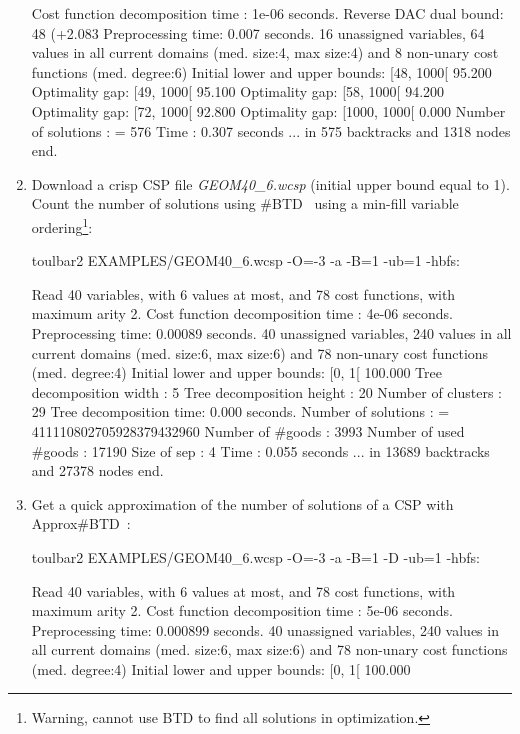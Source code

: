 \begin{enumerate}
{\begin{DoxyCode}
Cost function decomposition time : 1e-06 seconds.
Reverse DAC dual bound: 48 (+2.083%
Preprocessing time: 0.007 seconds.
16 unassigned variables, 64 values in all current domains (med. size:4, max size:4) and 8 non-unary cost functions (med. degree:6)
Initial lower and upper bounds: [48, 1000[ 95.200%
Optimality gap: [49, 1000[ 95.100 %
Optimality gap: [58, 1000[ 94.200 %
Optimality gap: [72, 1000[ 92.800 %
Optimality gap: [1000, 1000[ 0.000 %
Number of solutions    : =  576
Time                   :    0.307 seconds
... in 575 backtracks and 1318 nodes
end.
\end{DoxyCode}}
\item Download a crisp CSP file {\em GEOM40\_6.wcsp} (initial upper bound equal to 1). Count the number of solutions using \#BTD~\cite{Favier09a} using a min-fill variable ordering\footnote{Warning, cannot use BTD to find all solutions in optimization.}:
\begin{DoxyCode}
	toulbar2 EXAMPLES/GEOM40_6.wcsp -O=-3 -a -B=1 -ub=1 -hbfs:
\end{DoxyCode}
{\scriptsize
\begin{DoxyCode}
Read 40 variables, with 6 values at most, and 78 cost functions, with maximum arity 2.
Cost function decomposition time : 4e-06 seconds.
Preprocessing time: 0.00089 seconds.
40 unassigned variables, 240 values in all current domains (med. size:6, max size:6) and 78 non-unary cost functions (med. degree:4)
Initial lower and upper bounds: [0, 1[ 100.000%
Tree decomposition width  : 5
Tree decomposition height : 20
Number of clusters        : 29
Tree decomposition time: 0.000 seconds.
Number of solutions    : =  411110802705928379432960
Number of #goods       :    3993
Number of used #goods  :    17190
Size of sep            :    4
Time                   :    0.055 seconds
... in 13689 backtracks and 27378 nodes
end.
\end{DoxyCode}}
\item Get a quick approximation of the number of solutions of a CSP with Approx\#BTD~\cite{Favier09a}:
\begin{DoxyCode}
	toulbar2 EXAMPLES/GEOM40_6.wcsp -O=-3 -a -B=1 -D -ub=1 -hbfs:
\end{DoxyCode}
{\scriptsize
\begin{DoxyCode}
Read 40 variables, with 6 values at most, and 78 cost functions, with maximum arity 2.
Cost function decomposition time : 5e-06 seconds.
Preprocessing time: 0.000899 seconds.
40 unassigned variables, 240 values in all current domains (med. size:6, max size:6) and 78 non-unary cost functions (med. degree:4)
Initial lower and upper bounds: [0, 1[ 100.000%


\end{DoxyCode}}
\end{enumerate}
